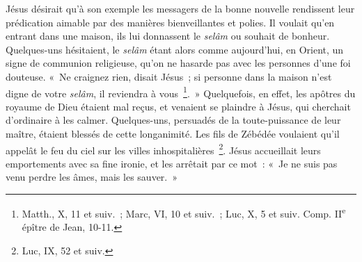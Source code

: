 \documentclass[french,twoside]{book} %
\begin{document}
Jésus désirait qu’à son exemple les messagers de la bonne nouvelle rendissent leur prédication aimable par des manières bienveillantes et polies. Il voulait qu’en entrant dans une maison, ils lui donnassent le {\itshape selâm} ou souhait de bonheur. Quelques-uns hésitaient, le {\itshape selâm} étant alors comme aujourd’hui, en Orient, un signe de communion religieuse, qu’on ne hasarde pas avec les personnes d’une foi douteuse. « Ne craignez rien, disait Jésus ; si personne dans la maison n’est digne de votre {\itshape selâm}, il reviendra à vous \footnote{ Matth., X, 11 et suiv. ; Marc, VI, 10 et suiv. ; Luc, X, 5 et suiv. Comp. II\textsuperscript{e} épître de Jean, 10-11.}. » Quelquefois, en effet, les apôtres du royaume de Dieu étaient mal reçus, et venaient se plaindre à Jésus, qui cherchait d’ordinaire à les calmer. Quelques-uns, persuadés de la toute-puissance de leur maître, étaient blessés de cette longanimité. Les fils de Zébédée voulaient qu’il appelât le feu du ciel sur les villes inhospitalières \footnote{Luc, IX, 52 et suiv.}. Jésus accueillait leurs emportements avec sa fine ironie, et les arrêtait par ce mot : « Je ne suis pas venu perdre les âmes, mais les sauver. »\par
\end{document}
